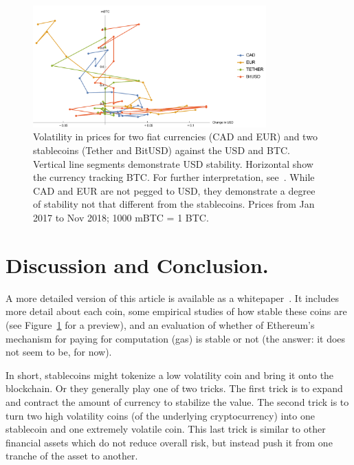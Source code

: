 
\begin{figure}[t]
	\centering
	\includegraphics[width=0.8\textwidth]{figures/newGraph.pdf}
	\caption{\label{fig:vol}
	Volatility in prices for two fiat currencies (CAD and EUR) and two stablecoins (Tether and BitUSD) against the USD and BTC.
	Vertical line segments demonstrate USD stability. 
	Horizontal show the currency tracking BTC.
	For further interpretation, see~\cite{CDM19}.
	While CAD and EUR are not pegged to USD, they demonstrate a degree of stability not that different from the stablecoins. 
	Prices from Jan 2017 to Nov 2018; 1000 mBTC = 1 BTC.}
\end{figure}

\section{Discussion and Conclusion.}

A more detailed version of this article is available as a whitepaper~\cite{CDM19}. It includes more detail about each coin, some empirical studies of how stable these coins are (see Figure~\ref{fig:vol} for a preview), and an evaluation of whether of Ethereum's mechanism for paying for computation (gas) is stable or not (the answer: it does not seem to be, for now).

In short, stablecoins might tokenize a low volatility coin and bring it onto the blockchain. Or they generally play one of two tricks. The first trick is to expand and contract the amount of currency to stabilize the value. The second trick is to turn two high volatility coins (\eg of the underlying cryptocurrency) into one stablecoin and one extremely volatile coin. This last trick is similar to other financial assets which do not reduce overall risk, but instead push it from one tranche of the asset to another.

